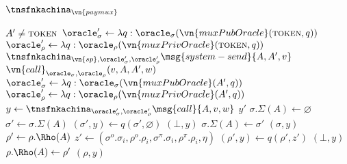\begin{transitionfn}{$\tnsfnkachina_{\vn{paymux}}$}
  \begin{helpers}
      \State \Assert $A' \neq \textsc{token}$
      \State \Let $\oracle_\sigma' \gets \lambda q :
        \oracle_\sigma(\vn{muxPubOracle}(\textsc{token}, q))$
      \State \Let $\oracle_\rho' \gets \lambda q :
        \oracle_\rho(\vn{muxPrivOracle}(\textsc{token}, q))$
      \State \Run $\tnsfnkachina_{\vn{sp},\oracle_\sigma',
        \oracle_\rho'}\msg{system-send}{A, A', v}$
      \State \Return $\vn{call}_{\oracle_\sigma,\oracle_\rho}(v, A, A', w)$
    \EndFunction
      \State \Let $\oracle_\sigma' \gets \lambda q :
        \oracle_\sigma(\vn{muxPubOracle}(A', q))$
      \State \Let $\oracle_\rho' \gets \lambda q :
        \oracle_\rho(\vn{muxPrivOracle}(A', q))$
      \Repeat
        \State \Let $y \gets \tnsfnkachina_{\oracle_\sigma',\oracle_\rho'}\msg{call}{A, v, w}$
        \EndIf
      \State \Return $y'$
    \EndFunction
        \Let $\sigma.\Sigma(A) \gets \varnothing$
      \EndIf
      \State \Let $\sigma' \gets \sigma.\Sigma(A)$
      \State \Let $(\sigma', y) \gets q(\sigma', \varnothing)$
        \Return $(\bot, y)$
      \Else
        \State \Let $\sigma.\Sigma(A) \gets \sigma'$
        \State \Return $(\sigma, y)$
      \EndIf
    \EndFunction
      \State \Let $\rho' \gets \rho.\Rho(A)$
      \State \Let $z' \gets (\sigma^o.\sigma_i, \rho^o.\rho_i,
        \sigma^\pi.\sigma_i, \rho^\pi.\rho_i, \eta)$
      \State \Let $(\rho', y) \gets q(\rho', z')$
        \Return $(\bot, y)$
      \Else
        \State \Let $\rho.\Rho(A) \gets \rho'$
        \State \Return $(\rho, y)$
      \EndIf
    \EndFunction
  \end{helpers}
\end{transitionfn}

